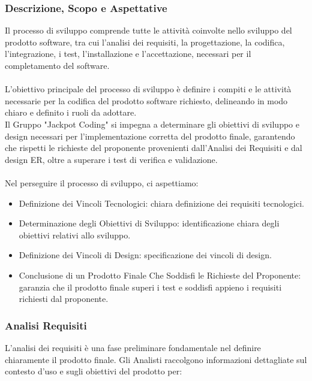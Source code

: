 \documentclass{article}
\begin{document}
\subsubsection{Descrizione, Scopo e Aspettative }
Il processo di sviluppo comprende tutte le attività coinvolte nello sviluppo del prodotto software, tra cui l'analisi dei requisiti, la progettazione, la codifica, l'integrazione, i test, l'installazione e l'accettazione, necessari per il completamento del software.\\\\
L'obiettivo principale del processo di sviluppo è definire i compiti e le attività necessarie per la codifica del prodotto software richiesto, delineando in modo chiaro e definito i ruoli da adottare.\\
Il Gruppo "Jackpot Coding" si impegna a determinare gli obiettivi di sviluppo e design necessari per l'implementazione corretta del prodotto finale, garantendo che rispetti le richieste del proponente provenienti dall'Analisi dei Requisiti e dal design ER, oltre a superare i test di verifica e validazione.\\\\
Nel perseguire il processo di sviluppo, ci aspettiamo:
\begin{itemize}
    \item Definizione dei Vincoli Tecnologici: chiara definizione dei requisiti tecnologici.
    \item Determinazione degli Obiettivi di Sviluppo: identificazione chiara degli obiettivi relativi allo sviluppo.
    \item Definizione dei Vincoli di Design: specificazione dei vincoli di design.
    \item Conclusione di un Prodotto Finale Che Soddisfi le Richieste del Proponente: garanzia che il prodotto finale superi i test e soddisfi appieno i requisiti richiesti dal proponente.
\end{itemize}

\subsubsection{Analisi Requisiti}
L'analisi dei requisiti è una fase preliminare fondamentale nel definire chiaramente il prodotto finale. Gli Analisti raccolgono informazioni dettagliate sul contesto d'uso e sugli obiettivi del prodotto per:
\end{document}
